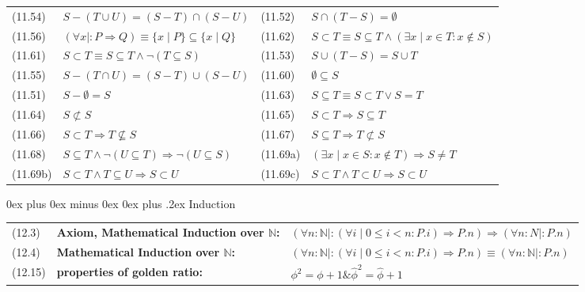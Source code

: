 \documentclass[letterpaper, 8pt]{extarticle}
\makeatletter
\renewcommand{\subsection}{\@startsection{subsection}{2}{0mm}%
                                {0ex plus 0ex minus 0ex}%
                                {0ex plus .2ex}%
                                {\normalfont\small\bfseries}}
\newcommand{\To}{\Rightarrow}
\makeatother
\begin{document}
\begin{multicols*}{3}
\begin{tabulary}{\linewidth}{@{}lLlL@{}}
        (11.54) & $S - (T \cup U) = (S - T) \cap (S - U)$ &
        (11.52) & $S \cap (T - S) = \emptyset$ \\
        (11.56) & $(\forall x \mid : P \To Q) \equiv \{ x \mid P \} \subseteq \{x \mid Q \}$ &
        (11.62) & $S \subset T \equiv S \subseteq T \land (\exists x \mid x \in T : x \notin S)$ \\
        (11.61) & $S \subset T \equiv S \subseteq T \land \neg (T \subseteq S)$ &
        (11.53) & $S \cup (T - S) = S \cup T$ \\
        (11.55) & $S - (T \cap U) = (S - T) \cup (S - U)$ &
        (11.60) & $\emptyset \subseteq S$ \\
        (11.51) & $S - \emptyset = S$ &
        (11.63) & $S \subseteq T \equiv S \subset T \lor S = T$ \\
        (11.64) & $S \not\subset S$ &
        (11.65) & $S \subset T \To S \subseteq T$ \\
        (11.66) & $S \subset T \To T \not\subseteq S$ &
        (11.67) & $S \subseteq T \To T \not\subset S$ \\
        (11.68) & $S \subseteq T \land \neg (U \subseteq T) \To \neg(U \subseteq S)$ &
        (11.69a) & $(\exists x \mid x \in S : x \notin T) \To S \neq T$ \\
        (11.69b) & $S \subset T \land T \subseteq U \To S \subset U$ &
        (11.69c) & $S \subset T \land T \subset U \To S \subset U$ \\
    \end{tabulary}

    \subsection{Induction}
    \begin{tabulary}{\linewidth}{@{}lLL@{}}
        (12.3) & \textbf{Axiom, Mathematical Induction over $\mathbb{N}$:} & $(\forall n : \mathbb{N} \mid : (\forall i \mid 0 \leq i < n : P.i) \To P.n) \To (\forall n : N \mid : P.n)$ \\
        (12.4) & \textbf{Mathematical Induction over $\mathbb{N}$:} & $(\forall n : \mathbb{N} \mid : (\forall i \mid 0 \leq i < n : P.i) \To P.n) \equiv (\forall n : \mathbb{N} \mid : P.n)$ \\
        (12.15) & \textbf{properties of golden ratio: } & $\phi^2 = \phi + 1 \& \hat{\phi}^2 = \hat{\phi} + 1$\\
    \end{tabulary}

\end{multicols*}
\end{document}
